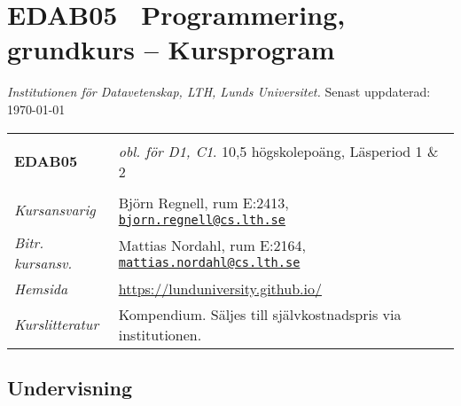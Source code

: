\documentclass[a4paper,12pt,oneside]{memoir}
\newcommand{\YEAR}{\CurrentYear}
\begin{document}

\newcommand{\Kurskod}{EDAB05}
\section*{\Kurskod~ Programmering, grundkurs  -- Kursprogram \YEAR}
\emph{Institutionen för Datavetenskap, LTH, Lunds Universitet.} Senast uppdaterad: \today\\

\begin{longtable}[l]{ll}
\hline\\[-0.75em]%

\textbf{\Kurskod} & \textit{obl. för D1, C1}. 10,5 högskolepoäng, Läsperiod 1 \& 2 \\[-0.75em] \tabularnewline
\hline%
\endhead
\emph{Kursansvarig}   & Björn Regnell, rum E:2413,
                        \href{mailto:bjorn.regnell@cs.lth.se}
                        {\nolinkurl{bjorn.regnell@cs.lth.se}}\\
\emph{Bitr. kursansv.}   & Mattias Nordahl, rum E:2164,
                        \href{mailto:mattias.nordahl@cs.lth.se}
                        {\nolinkurl{mattias.nordahl@cs.lth.se}}\tabularnewline
                        \emph{Hemsida}        
                        & \url{https://lunduniversity.github.io/}\tabularnewline
\emph{Kurslitteratur} & Kompendium. Säljes till självkostnadspris via institutionen.\tabularnewline

\hline
\end{longtable}

\subsection{Undervisning}\label{undervisning}
\end{document}
